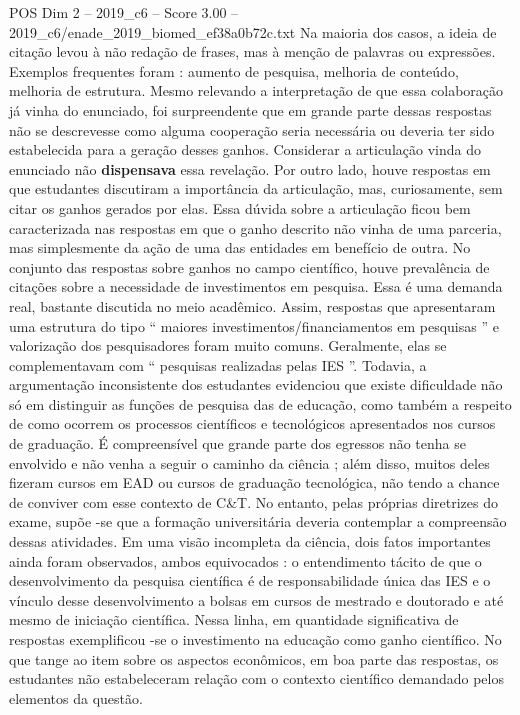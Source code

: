 \begin{textsample}{POS Dim 2 – 2019\_c6 – Score 3.00 – 2019\_c6/enade\_2019\_biomed\_ef38a0b72c.txt}
Na maioria dos casos, a ideia de citação levou à não redação de frases, mas à menção de palavras ou expressões.
Exemplos frequentes foram : aumento de pesquisa, melhoria de conteúdo, melhoria de estrutura.
Mesmo relevando a interpretação de que essa colaboração já vinha do enunciado, foi surpreendente que em grande parte dessas respostas não se descrevesse como alguma cooperação seria necessária ou deveria ter sido estabelecida para a geração desses ganhos.
Considerar a articulação vinda do enunciado não \textbf{dispensava} essa revelação.
Por outro lado, houve respostas em que estudantes discutiram a importância da articulação, mas, curiosamente, sem citar os ganhos gerados por elas.
Essa dúvida sobre a articulação ficou bem caracterizada nas respostas em que o ganho descrito não vinha de uma parceria, mas simplesmente da ação de uma das entidades em benefício de outra.
No conjunto das respostas sobre ganhos no campo científico, houve prevalência de citações sobre a necessidade de investimentos em pesquisa.
Essa é uma demanda real, bastante discutida no meio acadêmico.
Assim, respostas que apresentaram uma estrutura do tipo “ maiores investimentos/financiamentos em pesquisas ” e valorização dos pesquisadores foram muito comuns.
Geralmente, elas se complementavam com “ pesquisas realizadas pelas IES ”.
Todavia, a argumentação inconsistente dos estudantes evidenciou que existe dificuldade não só em distinguir as funções de pesquisa das de educação, como também a respeito de como ocorrem os processos científicos e tecnológicos apresentados nos cursos de graduação.
É compreensível que grande parte dos egressos não tenha se envolvido e não venha a seguir o caminho da ciência ; além disso, muitos deles fizeram cursos em EAD ou cursos de graduação tecnológica, não tendo a chance de conviver com esse contexto de C\&T.
No entanto, pelas próprias diretrizes do exame, supõe -se que a formação universitária deveria contemplar a compreensão dessas atividades.
Em uma visão incompleta da ciência, dois fatos importantes ainda foram observados, ambos equivocados : o entendimento tácito de que o desenvolvimento da pesquisa científica é de responsabilidade única das IES e o vínculo desse desenvolvimento a bolsas em cursos de mestrado e doutorado e até mesmo de iniciação científica.
Nessa linha, em quantidade significativa de respostas exemplificou -se o investimento na educação como ganho científico.
No que tange ao item sobre os aspectos econômicos, em boa parte das respostas, os estudantes não estabeleceram relação com o contexto científico demandado pelos elementos da questão.

\end{textsample}
